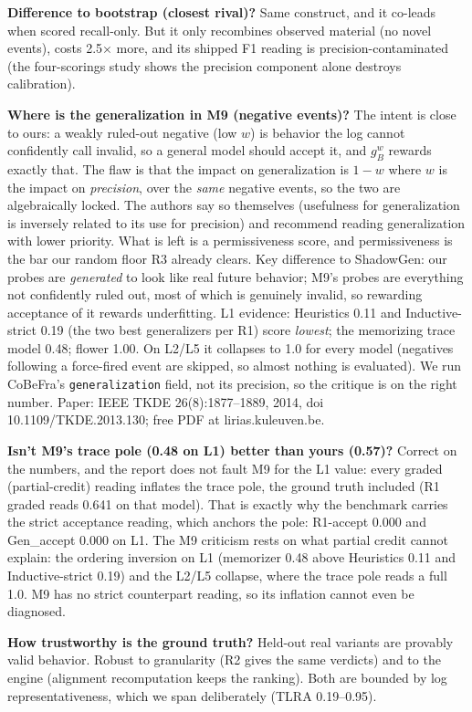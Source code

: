 \documentclass[10pt,twocolumn]{article}
\newcommand{\kv}[2]{\noindent\textbf{#1} #2\par}
\begin{document}
\kv{Difference to bootstrap (closest rival)?}{Same construct, and it co-leads when scored recall-only. But it only recombines observed material (no novel events), costs 2.5$\times$ more, and its shipped F1 reading is precision-contaminated (the four-scorings study shows the precision component alone destroys calibration).}
\kv{Where is the generalization in M9 (negative events)?}{The intent is close to ours: a weakly ruled-out negative (low $w$) is behavior the log cannot confidently call invalid, so a general model should accept it, and $g^w_B$ rewards exactly that. The flaw is that the impact on generalization is $1-w$ where $w$ is the impact on \emph{precision}, over the \emph{same} negative events, so the two are algebraically locked. The authors say so themselves (usefulness for generalization is inversely related to its use for precision) and recommend reading generalization with lower priority. What is left is a permissiveness score, and permissiveness is the bar our random floor R3 already clears. Key difference to ShadowGen: our probes are \emph{generated} to look like real future behavior; M9's probes are everything not confidently ruled out, most of which is genuinely invalid, so rewarding acceptance of it rewards underfitting. L1 evidence: Heuristics 0.11 and Inductive-strict 0.19 (the two best generalizers per R1) score \emph{lowest}; the memorizing trace model 0.48; flower 1.00. On L2/L5 it collapses to 1.0 for every model (negatives following a force-fired event are skipped, so almost nothing is evaluated). We run CoBeFra's \texttt{generalization} field, not its precision, so the critique is on the right number. Paper: IEEE TKDE 26(8):1877--1889, 2014, doi 10.1109/TKDE.2013.130; free PDF at lirias.kuleuven.be.}
\kv{Isn't M9's trace pole (0.48 on L1) better than yours (0.57)?}{Correct on the numbers, and the report does not fault M9 for the L1 value: every graded (partial-credit) reading inflates the trace pole, the ground truth included (R1 graded reads 0.641 on that model). That is exactly why the benchmark carries the strict acceptance reading, which anchors the pole: R1-accept 0.000 and Gen\_accept 0.000 on L1. The M9 criticism rests on what partial credit cannot explain: the ordering inversion on L1 (memorizer 0.48 above Heuristics 0.11 and Inductive-strict 0.19) and the L2/L5 collapse, where the trace pole reads a full 1.0. M9 has no strict counterpart reading, so its inflation cannot even be diagnosed.}
\kv{How trustworthy is the ground truth?}{Held-out real variants are provably valid behavior. Robust to granularity (R2 gives the same verdicts) and to the engine (alignment recomputation keeps the ranking). Both are bounded by log representativeness, which we span deliberately (TLRA 0.19--0.95).}
\end{document}

